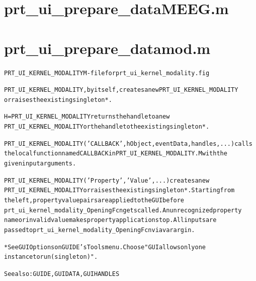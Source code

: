 \section{prt\_ui\_prepare\_dataMEEG.m}
\begin{alltt}

\end{alltt}


\section{prt\_ui\_prepare\_datamod.m}
\begin{alltt}

 PRT\_UI\_KERNEL\_MODALITY M-file for prt\_ui\_kernel\_modality.fig
 
 PRT\_UI\_KERNEL\_MODALITY, by itself, creates a new PRT\_UI\_KERNEL\_MODALITY 
 or raises the existing singleton*.
 
 H = PRT\_UI\_KERNEL\_MODALITY returns the handle to a new 
 PRT\_UI\_KERNEL\_MODALITY or the handle to the existing singleton*.
 
 PRT\_UI\_KERNEL\_MODALITY('CALLBACK',hObject,eventData,handles,...) calls 
 the local function named CALLBACK in PRT\_UI\_KERNEL\_MODALITY.M with the 
 given input arguments.
 
 PRT\_UI\_KERNEL\_MODALITY('Property','Value',...) creates a new 
 PRT\_UI\_KERNEL\_MODALITY or raises the existing singleton*.  Starting from 
 the left, property value pairs are applied to the GUI before 
 prt\_ui\_kernel\_modality\_OpeningFcn gets called.  An unrecognized property 
 name or invalid value makes property application stop.  All inputs are 
 passed to prt\_ui\_kernel\_modality\_OpeningFcn via varargin.
 
 *See GUI Options on GUIDE's Tools menu.  Choose "GUI allows only one
  instance to run (singleton)".
 
 See also: GUIDE, GUIDATA, GUIHANDLES
\end{alltt}


